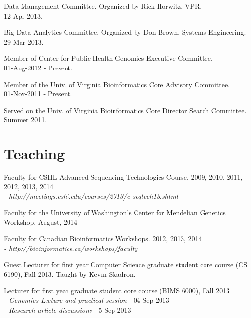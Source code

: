 \documentclass[margin,line]{cv}
\begin{document}
\begin{resume}
    Data Management Committee. Organized by Rick Horwitz, VPR.\\
    12-Apr-2013.

    Big Data Analytics Committee. Organized by Don Brown, Systems Engineering.\\
    29-Mar-2013.

    Member of Center for Public Health Genomics Executive Committee.\\
    01-Aug-2012 - Present.

    \vspace{-2mm}
    Member of the Univ. of Virginia Bioinformatics Core Advisory Committee.\\
    01-Nov-2011 - Present.

    \vspace{-2mm}
    Served on the Univ. of Virginia Bioinformatics Core Director Search Committee. \\
    Summer 2011.



    \section{\mysidestyle Teaching}


    Faculty for CSHL Advanced Sequencing Technologies Course, 2009, 2010, 2011, 2012, 2013, 2014\\
    \emph{- http://meetings.cshl.edu/courses/2013/c-seqtech13.shtml}

    \vspace{-2mm}
    Faculty for the University of Washington's Center for Mendelian Genetics Workshop. August, 2014

    \vspace{-2mm}
    Faculty for Canadian Bioinformatics Workshops. 2012, 2013, 2014 \\
    \emph{- http://bioinformatics.ca/workshops/faculty}

    \vspace{-2mm}
    Guest Lecturer for first year Computer Science graduate student core course (CS 6190), Fall 2013. Taught by Kevin Skadron.

    \vspace{-2mm}
    Lecturer for first year graduate student core course (BIMS 6000), Fall 2013 \\
    \emph{- Genomics Lecture and practical session} - 04-Sep-2013 \\
    \emph{- Research article discussions} - 5-Sep-2013


\end{resume}
\end{document}

